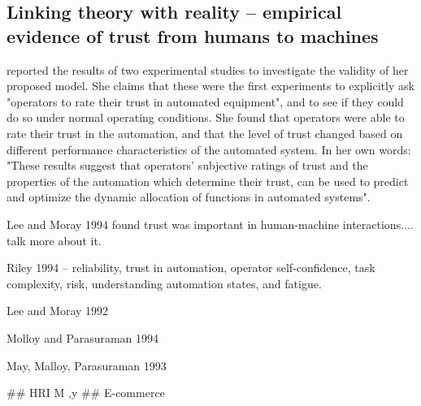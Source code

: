 \subsection{Linking theory with reality -- empirical evidence of trust from humans to machines}
    \cite{Muir1996-gt} reported the results of two experimental studies to investigate the validity of her proposed model. She claims that these were the first experiments to explicitly ask "operators to rate their trust in automated equipment", and to see if they could do so under normal operating conditions. She found that operators were able to rate their trust in the automation, and that the level of trust changed based on different performance characteristics of the automated system. In her own words: "These results suggest that operators' subjective ratings of trust and the properties of the automation which determine their trust, can be used to predict and optimize the dynamic allocation of functions in automated systems".

    Lee and Moray 1994 found trust was important in human-machine interactions.... talk more about it.

    Riley 1994 -- reliability, trust in automation, operator self-confidence, task complexity, risk, understanding automation states, and fatigue.

    Lee and Moray 1992

    Molloy and Parasuraman 1994

    May, Malloy, Parasuraman 1993

    ## HRI
    M ,y
    ## E-commerce
